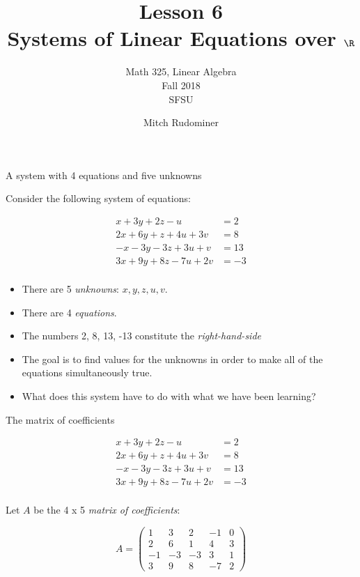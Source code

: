 \documentclass{beamer}
\title{Lesson 6 \\ Systems of Linear Equations over $\R$}
\subtitle{Math 325, Linear Algebra \\ Fall 2018 \\ SFSU}
\author{Mitch Rudominer}
\date{}
\begin{document}
\begin{frame}
  \titlepage
\end{frame}

\begin{frame}{A system with 4 equations and five unknowns}

Consider the following system of equations:

\begin{align*}
 x + 3y + 2z - u  \qquad &= 2 \\
2x + 6y + z + 4u + 3v  &= 8 \\
-x -3y  -3z + 3u + v  &= 13 \\
3x + 9y + 8z  -7u + 2v  &= -3 \\
\end{align*}

\begin{itemize}
\item There are 5 \emph{unknowns}: $x, y, z, u, v$.
\item There are 4 \emph{equations}.
\item The numbers 2, 8, 13, -13 constitute the \emph{right-hand-side}
\item The goal is to find values for the unknowns in order to make all of the
equations simultaneously true.
\item What does this system have to do with what we have been learning?
\end{itemize}

\end{frame}


\begin{frame}{The matrix of coefficients}

\begin{align*}
 x + 3y + 2z - u  \qquad &= 2 \\
2x + 6y + z + 4u + 3v  &= 8 \\
-x -3y  -3z + 3u + v  &= 13 \\
3x + 9y + 8z  -7u + 2v  &= -3 \\
\end{align*}

Let $A$ be the 4 x 5 \emph{matrix of coefficients}:

$$
A =
\begin{pmatrix}
1 & 3 & 2 & -1 & 0 \\
2 & 6 & 1 & 4 & 3\\
-1 & -3 & -3 & 3 & 1 \\
3 & 9 & 8 & -7 & 2
\end{pmatrix}
$$

\end{frame}
\end{document}
